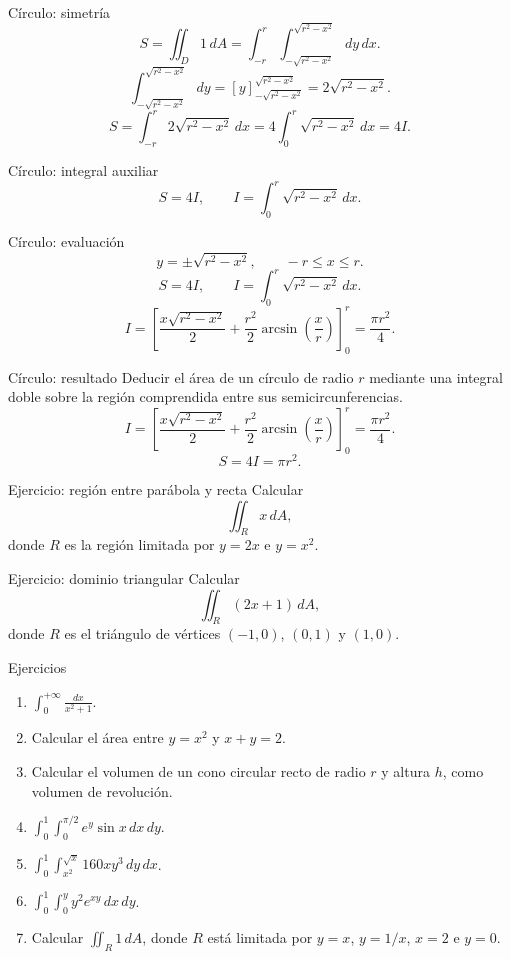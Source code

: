 \documentclass[original_version/main.tex]{subfiles}
\begin{document}
\begin{frame}{Círculo: simetría}
\small \[S=\iint_D1\,dA=\int_{-r}^r\int_{-\sqrt{r^2-x^2}}^{\sqrt{r^2-x^2}}dy\,dx.\]\[\int_{-\sqrt{r^2-x^2}}^{\sqrt{r^2-x^2}}dy=[y]_{-\sqrt{r^2-x^2}}^{\sqrt{r^2-x^2}}=2\sqrt{r^2-x^2}.\]\[S=\int_{-r}^r2\sqrt{r^2-x^2}\,dx=4\int_0^r\sqrt{r^2-x^2}\,dx=4I.\]
\end{frame}

\begin{frame}{Círculo: integral auxiliar}
\[S=4I,\qquad I=\int_0^r\sqrt{r^2-x^2}\,dx.\]
\end{frame}

\begin{frame}{Círculo: evaluación}
\small \[y=\pm\sqrt{r^2-x^2},\qquad -r\le x\le r.\]\[S=4I,\qquad I=\int_0^r\sqrt{r^2-x^2}\,dx.\]\[I=\left[\frac{x\sqrt{r^2-x^2}}2+\frac{r^2}{2}\arcsin\!\left(\frac xr\right)\right]_0^r=\frac{\pi r^2}{4}.\]
\end{frame}

\begin{frame}{Círculo: resultado}
\small Deducir el área de un círculo de radio $r$ mediante una integral doble sobre la región comprendida entre sus semicircunferencias.\[I=\left[\frac{x\sqrt{r^2-x^2}}2+\frac{r^2}{2}\arcsin\!\left(\frac xr\right)\right]_0^r=\frac{\pi r^2}{4}.\]\[\boxed{S=4I=\pi r^2.}\]
\end{frame}

\begin{frame}{Ejercicio: región entre parábola y recta}
Calcular\[\iint_R x\,dA,\]donde $R$ es la región limitada por $y=2x$ e $y=x^2$.
\end{frame}

\begin{frame}{Ejercicio: dominio triangular}
Calcular\[\iint_R(2x+1)\,dA,\]donde $R$ es el triángulo de vértices $(-1,0)$, $(0,1)$ y $(1,0)$.
\end{frame}

\begin{frame}{Ejercicios}
\footnotesize\begin{enumerate}\item $\displaystyle\int_0^{+\infty}\frac{dx}{x^2+1}$.\item Calcular el área entre $y=x^2$ y $x+y=2$.\item Calcular el volumen de un cono circular recto de radio $r$ y altura $h$, como volumen de revolución.\item $\displaystyle\int_0^1\int_0^{\pi/2}e^y\sin x\,dx\,dy$.\item $\displaystyle\int_0^1\int_{x^2}^{\sqrt x}160xy^3\,dy\,dx$.\item $\displaystyle\int_0^1\int_0^y y^2e^{xy}\,dx\,dy$.\item Calcular $\displaystyle\iint_R1\,dA$, donde $R$ está limitada por $y=x$, $y=1/x$, $x=2$ e $y=0$.\end{enumerate}
\end{frame}
\end{document}
